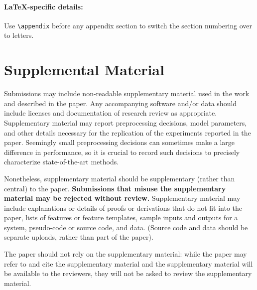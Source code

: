 \documentclass[10pt,twocolumn,letterpaper]{article}
\begin{document}
\paragraph{\LaTeX-specific details:}
Use {\small\verb|\appendix|} before any appendix section to switch the section numbering over to letters.


\section{Supplemental Material}
\label{sec:supplemental}
Submissions may include\cite{GeoTran}\cite{CenterLoss}\cite{BucciROS}\cite{OldROS}\cite{CarlucciJigsaw} non-readable supplementary material used in the work and described in the paper.
Any accompanying software and/or data should include licenses and documentation of research review as appropriate.
Supplementary material may report preprocessing decisions, model parameters, and other details necessary for the replication of the experiments reported in the paper.
Seemingly small preprocessing decisions can sometimes make a large difference in performance, so it is crucial to record such decisions to precisely characterize state-of-the-art methods. 

Nonetheless, supplementary material should be supplementary (rather than central) to the paper.
\textbf{Submissions that misuse the supplementary material may be rejected without review.}
Supplementary material may include explanations or details of proofs or derivations that do not fit into the paper, lists of
features or feature templates, sample inputs and outputs for a system, pseudo-code or source code, and data.
(Source code and data should be separate uploads, rather than part of the paper).

The paper should not rely on the supplementary material: while the paper may refer to and cite the supplementary material and the supplementary material will be available to the reviewers, they will not be asked to review the supplementary material.

{\small


}
\end{document}
